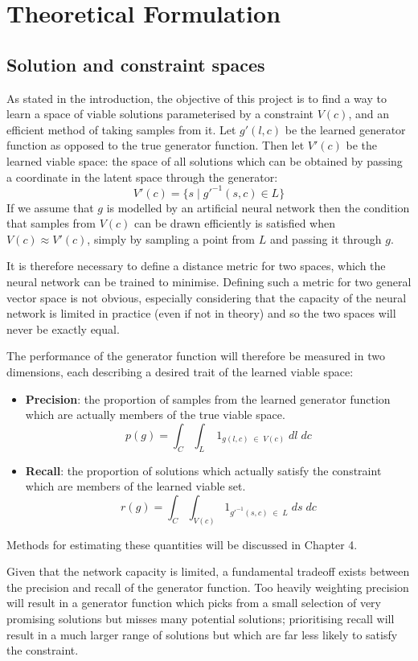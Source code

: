 \documentclass[../../main.tex]{subfiles}
\begin{document}
\chapter{Theoretical Formulation}

\section{Solution and constraint spaces}

As stated in the introduction, the objective of this project is to find a way to learn a space of viable solutions parameterised by a constraint $V(c)$, and an efficient method of taking samples from it.
Let $g'(l, c)$ be the learned generator function as opposed to the true generator function.
Then let $V'(c)$ be the learned viable space: the space of all solutions which can be obtained by passing a coordinate in the latent space through the generator:
$$V'(c) = \{s \; | \; g'^{-1}(s, c) \in L\}$$
If we assume that $g$ is modelled by an artificial neural network then the condition that samples from $V(c)$ can be drawn efficiently is satisfied when $V(c) \approx V'(c)$, simply by sampling a point from $L$ and passing it through $g$.

It is therefore necessary to define a distance metric for two spaces, which the neural network can be trained to minimise.
Defining such a metric for two general vector space is not obvious, especially considering that the capacity of the neural network is limited in practice (even if not in theory) and so the two spaces will never be exactly equal.

The performance of the generator function will therefore be measured in two dimensions, each describing a desired trait of the learned viable space:
\begin{itemize}
    \item[] \textbf{Precision}: the proportion of samples from the learned generator function which are actually members of the true viable space.
    $$p(g) = \int_{C}\int_{L} \; 1_{g(l, c) \; \in \; V(c)} \; dl \; dc$$ 
    \item[] \textbf{Recall}: the proportion of solutions which actually satisfy the constraint which are members of the learned viable set.
    $$r(g) = \int_{C}\int_{V(c)} 1_{g'^{-1}(s, c) \; \in \; L} \; ds \; dc$$ 
\end{itemize}
Methods for estimating these quantities will be discussed in Chapter 4.

Given that the network capacity is limited, a fundamental tradeoff exists between the precision and recall of the generator function.
Too heavily weighting precision will result in a generator function which picks from a small selection of very promising solutions but misses many potential solutions; prioritising recall will result in a much larger range of solutions but which are far less likely to satisfy the constraint.
\end{document}
